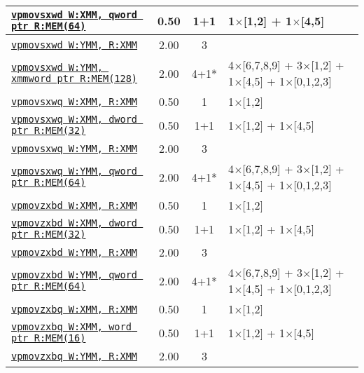 \documentclass[a4paper,english,fontsize=9]{scrartcl}
\begin{document}
\begin{longtable}{p{}ccL{.25\textwidth}}
  \midrule
  \texttt{\href{https://felixcloutier.com/x86/PMOVSX.html}{vpmovsxwd W:XMM, qword ptr R:MEM(64)}} & 0.50 & 1+1 & 1\(\times\)[1,2] + 1\(\times\)[4,5] \\
  \midrule
  \texttt{\href{https://felixcloutier.com/x86/PMOVSX.html}{vpmovsxwd W:YMM, R:XMM}} & 2.00 & 3 &  \\
  \midrule
  \texttt{\href{https://felixcloutier.com/x86/PMOVSX.html}{vpmovsxwd W:YMM, xmmword ptr R:MEM(128)}} & 2.00 & 4+1* & 4\(\times\)[6,7,8,9] + 3\(\times\)[1,2] + 1\(\times\)[4,5] + 1\(\times\)[0,1,2,3] \\
  \midrule
  \texttt{\href{https://felixcloutier.com/x86/PMOVSX.html}{vpmovsxwq W:XMM, R:XMM}} & 0.50 & 1 & 1\(\times\)[1,2] \\
  \midrule
  \texttt{\href{https://felixcloutier.com/x86/PMOVSX.html}{vpmovsxwq W:XMM, dword ptr R:MEM(32)}} & 0.50 & 1+1 & 1\(\times\)[1,2] + 1\(\times\)[4,5] \\
  \midrule
  \texttt{\href{https://felixcloutier.com/x86/PMOVSX.html}{vpmovsxwq W:YMM, R:XMM}} & 2.00 & 3 &  \\
  \midrule
  \texttt{\href{https://felixcloutier.com/x86/PMOVSX.html}{vpmovsxwq W:YMM, qword ptr R:MEM(64)}} & 2.00 & 4+1* & 4\(\times\)[6,7,8,9] + 3\(\times\)[1,2] + 1\(\times\)[4,5] + 1\(\times\)[0,1,2,3] \\
  \midrule
  \texttt{\href{https://felixcloutier.com/x86/PMOVZX.html}{vpmovzxbd W:XMM, R:XMM}} & 0.50 & 1 & 1\(\times\)[1,2] \\
  \midrule
  \texttt{\href{https://felixcloutier.com/x86/PMOVZX.html}{vpmovzxbd W:XMM, dword ptr R:MEM(32)}} & 0.50 & 1+1 & 1\(\times\)[1,2] + 1\(\times\)[4,5] \\
  \midrule
  \texttt{\href{https://felixcloutier.com/x86/PMOVZX.html}{vpmovzxbd W:YMM, R:XMM}} & 2.00 & 3 &  \\
  \midrule
  \texttt{\href{https://felixcloutier.com/x86/PMOVZX.html}{vpmovzxbd W:YMM, qword ptr R:MEM(64)}} & 2.00 & 4+1* & 4\(\times\)[6,7,8,9] + 3\(\times\)[1,2] + 1\(\times\)[4,5] + 1\(\times\)[0,1,2,3] \\
  \midrule
  \texttt{\href{https://felixcloutier.com/x86/PMOVZX.html}{vpmovzxbq W:XMM, R:XMM}} & 0.50 & 1 & 1\(\times\)[1,2] \\
  \midrule
  \texttt{\href{https://felixcloutier.com/x86/PMOVZX.html}{vpmovzxbq W:XMM, word ptr R:MEM(16)}} & 0.50 & 1+1 & 1\(\times\)[1,2] + 1\(\times\)[4,5] \\
  \midrule
  \texttt{\href{https://felixcloutier.com/x86/PMOVZX.html}{vpmovzxbq W:YMM, R:XMM}} & 2.00 & 3 &  \\

\end{longtable}
\end{document}
